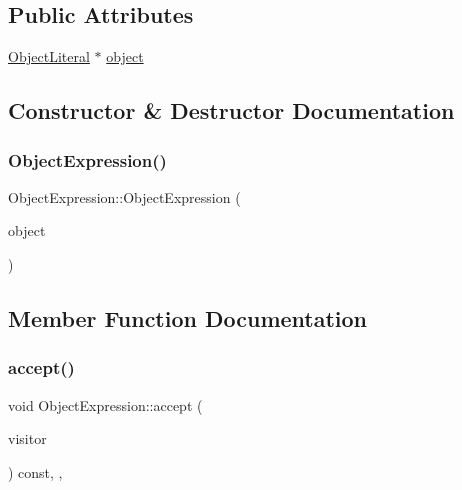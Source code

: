 \subsection*{Public Attributes}
\begin{DoxyCompactItemize}
\item 
\hyperlink{struct_object_literal}{Object\+Literal} $\ast$ \hyperlink{struct_object_expression_abd6be2f4cbb70b2ca388d57270bbf17c}{object}
\end{DoxyCompactItemize}


\subsection{Constructor \& Destructor Documentation}
\mbox{\label{struct_object_expression_a6fc7ddf18ed9892b85ba64d1d8e0a33b}} 
\subsubsection{\texorpdfstring{Object\+Expression()}{ObjectExpression()}}
{\footnotesize\ttfamily Object\+Expression\+::\+Object\+Expression (\begin{DoxyParamCaption}\item[{\hyperlink{struct_object_literal}{Object\+Literal} $\ast$}]{object }\end{DoxyParamCaption})\hspace{0.3cm}{\ttfamily [inline]}}



\subsection{Member Function Documentation}
\mbox{\label{struct_object_expression_a360acff3bec82217a5adf58218aed49d}} 
\subsubsection{\texorpdfstring{accept()}{accept()}}
{\footnotesize\ttfamily void Object\+Expression\+::accept (\begin{DoxyParamCaption}\item[{\hyperlink{struct_visitor}{Visitor} \&}]{visitor }\end{DoxyParamCaption}) const\hspace{0.3cm}{\ttfamily [inline]}, {\ttfamily [override]}, {\ttfamily [virtual]}}



